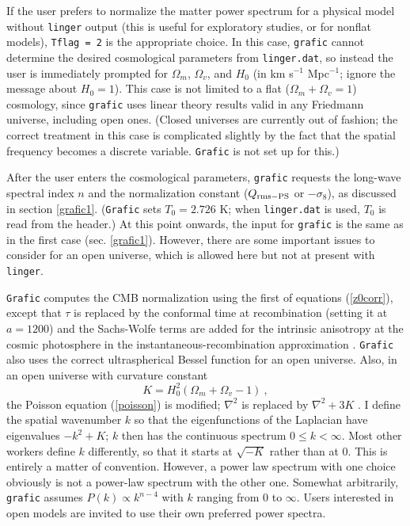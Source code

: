If the user prefers to normalize the matter power spectrum for a
physical model without {\tt linger} output (this is useful for
exploratory studies, or for nonflat models), {\tt Tflag = 2} is the
appropriate choice.  In this case, {\tt grafic} cannot determine the
desired cosmological parameters from {\tt linger.dat}, so instead the
user is immediately prompted for $\Omega_m$, $\Omega_v$, and $H_0$
(in km s$^{-1}$ Mpc$^{-1}$; ignore the message about $H_0=1$).  This
case is not limited to a flat ($\Omega_m+\Omega_v=1$) cosmology, since
{\tt grafic} uses linear theory results valid in any Friedmann universe,
including open ones.  (Closed universes are currently out of fashion;
the correct treatment in this case is complicated slightly by the
fact that the spatial frequency becomes a discrete variable.  {\tt Grafic}
is not set up for this.)

After the user enters the cosmological parameters, {\tt grafic} requests
the long-wave spectral index $n$ and the normalization constant
($Q_{\rm rms-PS}$ or $-\sigma_8$), as discussed in section \ref{grafic1}.
({\tt Grafic} sets $T_0=2.726$ K; when {\tt linger.dat} is used, $T_0$
is read from the header.)  At this point onwards, the input for {\tt grafic}
is the same as in the first case (sec. \ref{grafic1}).  However, there are
some important issues to consider for an open universe, which is allowed here
but not at present with {\tt linger}.

{\tt Grafic} computes the CMB normalization using the first of
equations (\ref{z0corr}), except that $\tau$ is replaced by the conformal
time at recombination (setting it at $a=1200$) and the Sachs-Wolfe terms
are added for the intrinsic anisotropy at the cosmic photosphere in the
instantaneous-recombination approximation \cite{sw67}.  {\tt Grafic}
also uses the correct ultraspherical Bessel function for an open
universe.  Also, in an open universe with curvature constant
\begin{equation}
\label{curv}
  K=H_0^2(\Omega_m+\Omega_v-1)\ ,
\end{equation}
the Poisson equation (\ref{poisson}) is modified; $\nabla^2$ is replaced
by $\nabla^2+3K$ \cite{blh95}.  I define the spatial wavenumber $k$ so that
the eigenfunctions of the Laplacian have eigenvalues $-k^2+K$; $k$ then
has the continuous spectrum $0\le k<\infty$.  Most other workers define
$k$ differently, so that it starts at $\sqrt{-K}$ rather than at 0.  This
is entirely a matter of convention.  However, a power law spectrum with
one choice obviously is not a power-law spectrum with the other one.
Somewhat arbitrarily, {\tt grafic} assumes $P(k)\propto k^{n-4}$ with
$k$ ranging from 0 to $\infty$.  Users interested in open models are
invited to use their own preferred power spectra.

